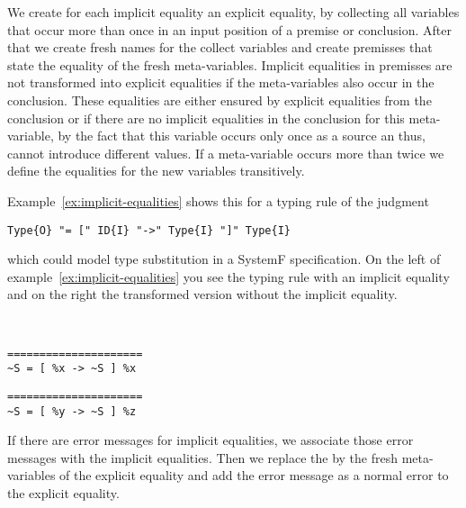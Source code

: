 We create for each implicit equality an explicit equality, by
collecting all variables that occur more than once in an input
position of a premise or conclusion. After that we create fresh names
for the collect variables and create premisses that state the equality
of the fresh meta-variables. Implicit equalities in premisses are not
transformed into explicit equalities if the meta-variables also occur
in the conclusion. These equalities are either ensured by explicit
equalities from the conclusion or if there are no implicit equalities
in the conclusion for this meta-variable, by the fact that this
variable occurs only once as a source an thus, cannot introduce
different values. If a meta-variable occurs more than twice we define
the equalities for the new variables transitively.

Example~\ref{ex:implicit-equalities} shows this for
a typing rule of the judgment

\begin{lstlisting}[language=sltc]
Type{O} "= [" ID{I} "->" Type{I} "]" Type{I}
\end{lstlisting}

which could model type substitution in a SystemF specification. On the
left of example~\ref{ex:implicit-equalities} you see the typing rule
with an implicit equality and on the right the transformed version
without the implicit equality.

\begin{example}{~}
\newline
  \begin{minipage}[b]{.45\linewidth}
    \begin{lstlisting}[language=sltc]
=====================
~S = [ %x -> ~S ] %x
\end{lstlisting}
  \end{minipage}
  \begin{minipage}[b]{.45\linewidth}
    \begin{lstlisting}[language=sltc]
%y = %z
=====================
~S = [ %y -> ~S ] %z
\end{lstlisting}
  \end{minipage}
\label{ex:implicit-equalities}
\end{example}

If there are error messages for implicit equalities, we associate
those error messages with the implicit equalities. Then we replace the
by the fresh meta-variables of the explicit equality and add the error
message as a normal error to the explicit equality.

